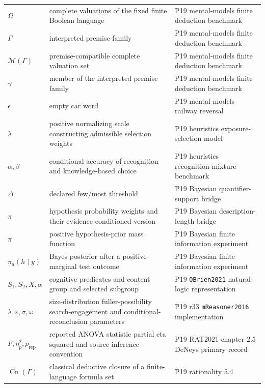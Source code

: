 \begin{longtable}{@{}p{}p{}p{}@{}}
\(\Omega\) & complete valuations of the fixed finite Boolean language & P19 mental-\allowbreak{}models finite deduction benchmark \\
\(\Gamma\) & interpreted premise family & P19 mental-\allowbreak{}models finite deduction benchmark \\
\(\mathcal M(\Gamma)\) & premise-compatible complete valuation set & P19 mental-\allowbreak{}models finite deduction benchmark \\
\(\gamma\) & member of the interpreted premise family & P19 mental-\allowbreak{}models finite deduction benchmark \\
\(\epsilon\) & empty car word & P19 mental-\allowbreak{}models railway reversal \\
\(\lambda\) & positive normalizing scale constructing admissible selection weights & P19 heuristics exposure-\allowbreak{}selection model \\
\(\alpha,\allowbreak \beta\) & conditional accuracy of recognition and knowledge-based choice & P19 heuristics recognition-\allowbreak{}mixture benchmark \\
\(\Delta\) & declared few/most threshold & P19 Bayesian quantifier-\allowbreak{}support bridge \\
\(\pi\) & hypothesis probability weights and their evidence-conditioned version & P19 Bayesian description-\allowbreak{}length bridge \\
\(\pi\) & positive hypothesis-prior mass function & P19 Bayesian finite information experiment \\
\(\pi_a(h\mid y)\) & Bayes posterior after a positive-marginal test outcome & P19 Bayesian finite information experiment \\
\(S_1,\allowbreak S_2,\allowbreak X,\allowbreak \alpha\) & cognitive predicates and content group and selected subgroup & P19 \texttt{OBrien2021} natural-\allowbreak{}logic representation \\
\(\lambda,\allowbreak \varepsilon,\allowbreak \sigma,\allowbreak \omega\) & size-distribution fuller-possibility search-engagement and conditional-reconclusion parameters & P19 r33 \texttt{mReasoner2016} implementation \\
\(F,\allowbreak \eta_p^2,\allowbreak p_{\mathrm{rep}}\) & reported ANOVA statistic partial eta squared and source inference convention & P19 RAT2021 chapter 2.\allowbreak{}5 DeNeys primary record \\
\(\operatorname{Cn}(\Gamma)\) & classical deductive closure of a finite-language formula set & P19 rationality 5.\allowbreak{}4 \\

\end{longtable}
